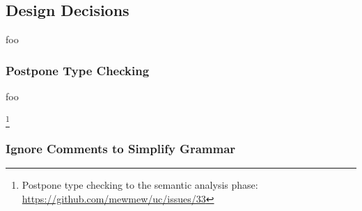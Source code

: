\subsection{Design Decisions}

foo

\subsubsection{Postpone Type Checking}





foo

\footnote{Postpone type checking to the semantic analysis phase: \url{https://github.com/mewmew/uc/issues/33}}

\subsubsection{Ignore Comments to Simplify Grammar}

%
%
%

